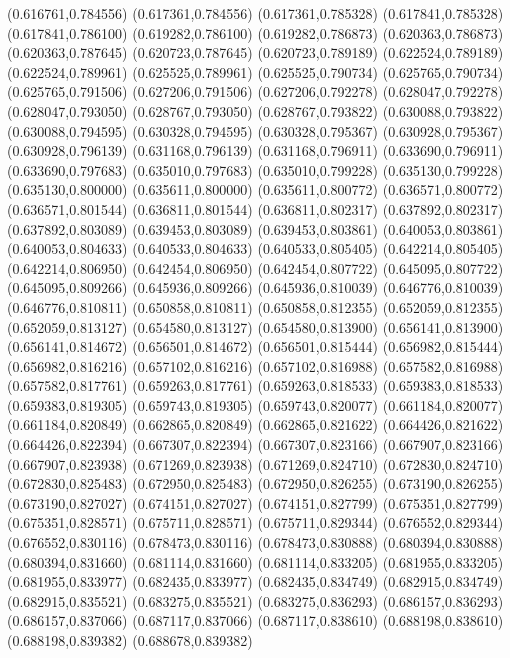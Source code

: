 (0.616761,0.784556)
(0.617361,0.784556)
(0.617361,0.785328)
(0.617841,0.785328)
(0.617841,0.786100)
(0.619282,0.786100)
(0.619282,0.786873)
(0.620363,0.786873)
(0.620363,0.787645)
(0.620723,0.787645)
(0.620723,0.789189)
(0.622524,0.789189)
(0.622524,0.789961)
(0.625525,0.789961)
(0.625525,0.790734)
(0.625765,0.790734)
(0.625765,0.791506)
(0.627206,0.791506)
(0.627206,0.792278)
(0.628047,0.792278)
(0.628047,0.793050)
(0.628767,0.793050)
(0.628767,0.793822)
(0.630088,0.793822)
(0.630088,0.794595)
(0.630328,0.794595)
(0.630328,0.795367)
(0.630928,0.795367)
(0.630928,0.796139)
(0.631168,0.796139)
(0.631168,0.796911)
(0.633690,0.796911)
(0.633690,0.797683)
(0.635010,0.797683)
(0.635010,0.799228)
(0.635130,0.799228)
(0.635130,0.800000)
(0.635611,0.800000)
(0.635611,0.800772)
(0.636571,0.800772)
(0.636571,0.801544)
(0.636811,0.801544)
(0.636811,0.802317)
(0.637892,0.802317)
(0.637892,0.803089)
(0.639453,0.803089)
(0.639453,0.803861)
(0.640053,0.803861)
(0.640053,0.804633)
(0.640533,0.804633)
(0.640533,0.805405)
(0.642214,0.805405)
(0.642214,0.806950)
(0.642454,0.806950)
(0.642454,0.807722)
(0.645095,0.807722)
(0.645095,0.809266)
(0.645936,0.809266)
(0.645936,0.810039)
(0.646776,0.810039)
(0.646776,0.810811)
(0.650858,0.810811)
(0.650858,0.812355)
(0.652059,0.812355)
(0.652059,0.813127)
(0.654580,0.813127)
(0.654580,0.813900)
(0.656141,0.813900)
(0.656141,0.814672)
(0.656501,0.814672)
(0.656501,0.815444)
(0.656982,0.815444)
(0.656982,0.816216)
(0.657102,0.816216)
(0.657102,0.816988)
(0.657582,0.816988)
(0.657582,0.817761)
(0.659263,0.817761)
(0.659263,0.818533)
(0.659383,0.818533)
(0.659383,0.819305)
(0.659743,0.819305)
(0.659743,0.820077)
(0.661184,0.820077)
(0.661184,0.820849)
(0.662865,0.820849)
(0.662865,0.821622)
(0.664426,0.821622)
(0.664426,0.822394)
(0.667307,0.822394)
(0.667307,0.823166)
(0.667907,0.823166)
(0.667907,0.823938)
(0.671269,0.823938)
(0.671269,0.824710)
(0.672830,0.824710)
(0.672830,0.825483)
(0.672950,0.825483)
(0.672950,0.826255)
(0.673190,0.826255)
(0.673190,0.827027)
(0.674151,0.827027)
(0.674151,0.827799)
(0.675351,0.827799)
(0.675351,0.828571)
(0.675711,0.828571)
(0.675711,0.829344)
(0.676552,0.829344)
(0.676552,0.830116)
(0.678473,0.830116)
(0.678473,0.830888)
(0.680394,0.830888)
(0.680394,0.831660)
(0.681114,0.831660)
(0.681114,0.833205)
(0.681955,0.833205)
(0.681955,0.833977)
(0.682435,0.833977)
(0.682435,0.834749)
(0.682915,0.834749)
(0.682915,0.835521)
(0.683275,0.835521)
(0.683275,0.836293)
(0.686157,0.836293)
(0.686157,0.837066)
(0.687117,0.837066)
(0.687117,0.838610)
(0.688198,0.838610)
(0.688198,0.839382)
(0.688678,0.839382)
